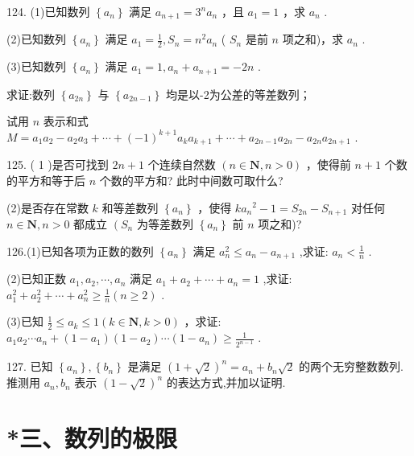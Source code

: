 \documentclass[10pt]{article}
\newcommand*\circled[1]{\tikz[baseline=(char.base)]{\node[shape=circle,draw,inner sep=1.5pt] (char) {\small #1};}}
\begin{document}
124. (1)已知数列 \(\left\{  {a}_{n}\right\}\) 满足 \({a}_{n + 1} = {3}^{n}{a}_{n}\) ，且 \({a}_{1} = 1\) ，求 \({a}_{n}\) .

(2)已知数列 \(\left\{  {a}_{n}\right\}\) 满足 \({a}_{1} = \frac{1}{2},{S}_{n} = {n}^{2}{a}_{n}\) ( \({S}_{n}\) 是前 \(n\) 项之和)，求 \({a}_{n}\) .

(3)已知数列 \(\left\{  {a}_{n}\right\}\) 满足 \({a}_{1} = 1,{a}_{n} + {a}_{n + 1} =  - {2n}\) .

 \circled{1}  求证:数列 \(\left\{  {a}_{2n}\right\}\) 与 \(\left\{  {a}_{{2n} - 1}\right\}\) 均是以-2为公差的等差数列；

 \circled{2}  试用 \(n\) 表示和式 \(M = {a}_{1}{a}_{2} - {a}_{2}{a}_{3} + \cdots  + {\left( -1\right) }^{k + 1}{a}_{k}{a}_{k + 1} + \cdots  + {a}_{{2n} - 1}{a}_{2n} - {a}_{2n}{a}_{{2n} + 1}\) .

125. ( 1 )是否可找到 \({2n} + 1\) 个连续自然数 \(\left( {n \in  \mathbf{N},n > 0}\right)\) ，使得前 \(n + 1\) 个数的平方和等于后 \(n\) 个数的平方和? 此时中间数可取什么?

(2)是否存在常数 \(k\) 和等差数列 \(\left\{  {a}_{n}\right\}\) ，使得 \(k{a}_{n}{}^{2} - 1 = {S}_{2n} - {S}_{n + 1}\) 对任何 \(n \in  \mathbf{N},n > 0\) 都成立 \(\left( {S}_{n}\right.\) 为等差数列 \(\left\{  {a}_{n}\right\}\) 前 \(n\) 项之和)?

126.(1)已知各项为正数的数列 \(\left\{  {a}_{n}\right\}\) 满足 \({a}_{n}^{2} \leq  {a}_{n} - {a}_{n + 1}\) ,求证: \({a}_{n} < \frac{1}{n}\) .

(2)已知正数 \({a}_{1},{a}_{2},\cdots ,{a}_{n}\) 满足 \({a}_{1} + {a}_{2} + \cdots  + {a}_{n} = 1\) ,求证: \({a}_{1}^{2} + {a}_{2}^{2} + \cdots  + {a}_{n}^{2} \geq  \frac{1}{n}\left( {n \geq  2}\right)\) .

(3)已知 \(\frac{1}{2} \leq  {a}_{k} \leq  1\left( {k \in  \mathbf{N},k > 0}\right)\) ，求证: \({a}_{1}{a}_{2}\cdots {a}_{n} + \left( {1 - {a}_{1}}\right) \left( {1 - {a}_{2}}\right) \cdots \left( {1 - {a}_{n}}\right)  \geq  \frac{1}{{2}^{n - 1}}\) .

127. 已知 \(\left\{  {a}_{n}\right\}  ,\left\{  {b}_{n}\right\}\) 是满足 \({\left( 1 + \sqrt{2}\right) }^{n} = {a}_{n} + {b}_{n}\sqrt{2}\) 的两个无穷整数数列. 推测用 \({a}_{n},{b}_{n}\) 表示 \({\left( 1 - \sqrt{2}\right) }^{n}\) 的表达方式,并加以证明.

\section*{*三、数列的极限}
\end{document}

